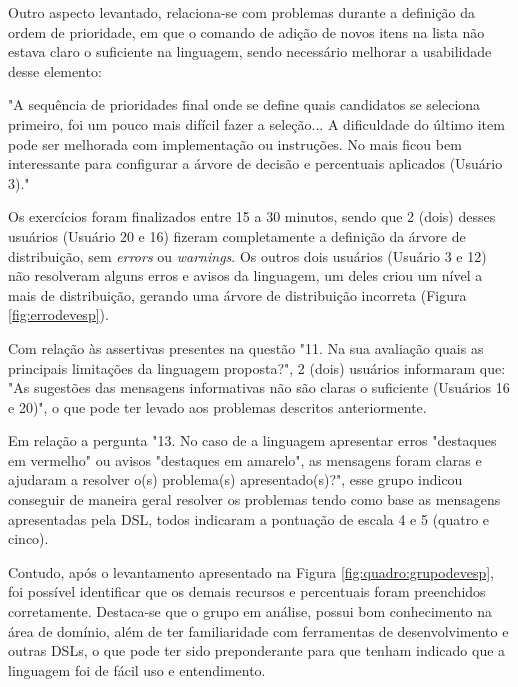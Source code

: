 Outro aspecto levantado, relaciona-se com problemas durante a definição da ordem de prioridade, em que o comando de adição de novos itens na lista não estava claro o suficiente na linguagem, sendo necessário melhorar a usabilidade desse elemento:

\begin{citacao}
"A sequência de prioridades final onde se define quais candidatos se seleciona primeiro, foi um pouco mais difícil fazer a seleção... A dificuldade do último item pode ser melhorada com implementação ou instruções. No mais ficou bem interessante para configurar a árvore de decisão e percentuais aplicados (Usuário 3)." 
\end{citacao}

Os exercícios foram finalizados entre 15 a 30 minutos, sendo que 2 (dois) desses usuários (Usuário 20 e 16) fizeram completamente a definição da árvore de distribuição, sem \textit{errors} ou \textit{warnings}. Os outros dois usuários (Usuário 3 e 12) não resolveram alguns erros e avisos da linguagem, um deles criou um nível a mais de distribuição, gerando uma árvore de distribuição incorreta (Figura \ref{fig:errodevesp}). 



\newpage



Com relação às assertivas presentes na questão "11. Na sua avaliação quais as principais limitações da linguagem proposta?", 2 (dois) usuários informaram que: "As sugestões das mensagens informativas não são claras o suficiente (Usuários 16 e 20)", o que pode ter levado aos problemas descritos anteriormente.

Em relação a pergunta "13. No caso de a linguagem apresentar erros "destaques em vermelho" ou avisos "destaques em amarelo", as mensagens foram claras e ajudaram a resolver o(s) problema(s) apresentado(s)?", esse grupo indicou conseguir de maneira geral resolver os problemas tendo como base as mensagens apresentadas pela DSL, todos indicaram a pontuação de escala 4 e 5 (quatro e cinco).

Contudo, após o levantamento apresentado na Figura \ref{fig:quadro:grupodevesp}, foi possível identificar que os demais recursos e percentuais foram preenchidos corretamente. Destaca-se que o grupo em análise, possui bom conhecimento na área de domínio, além de ter familiaridade com ferramentas de desenvolvimento e outras \gls{DSL}s, o que pode ter sido preponderante para que tenham indicado que a linguagem foi de fácil uso e entendimento. 

